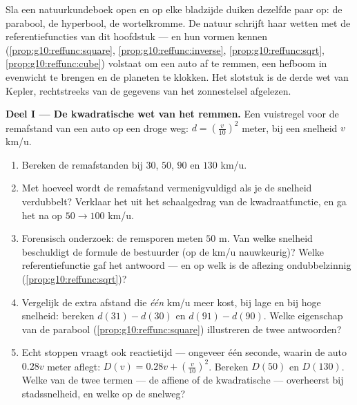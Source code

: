 \begin{problem}
\label{pb:g10:reffunc:1}
Sla een natuurkundeboek open en op elke bladzijde duiken dezelfde paar
 op: de parabool, de hyperbool, de wortelkromme. De natuur schrijft
haar wetten met de referentiefuncties van dit hoofdstuk --- en hun vormen
kennen (\cref{prop:g10:reffunc:square}, \cref{prop:g10:reffunc:inverse},
\cref{prop:g10:reffunc:sqrt}, \cref{prop:g10:reffunc:cube}) volstaat om een
auto af te remmen, een hefboom in evenwicht te brengen en de planeten te
klokken. Het slotstuk is de derde wet van Kepler, rechtstreeks van de
gegevens van het zonnestelsel afgelezen.

\medskip
\noindent\textbf{Deel I --- De kwadratische wet van het remmen.}
Een vuistregel voor de remafstand van een auto op een droge weg:
$d = \left(\frac{v}{10}\right)^{2}$ meter, bij een snelheid $v$ km/u.
\begin{enumerate}
  \item Bereken de remafstanden bij $30$, $50$, $90$ en $130$ km/u.
  \item Met hoeveel wordt de remafstand vermenigvuldigd als je de snelheid
        verdubbelt? Verklaar het uit het schaalgedrag van de
        kwadraatfunctie, en ga het na op $50 \to 100$ km/u.
  \item Forensisch onderzoek: de remsporen meten $50$ m. Van welke snelheid
        beschuldigt de formule de bestuurder (op de km/u nauwkeurig)? Welke
        referentiefunctie gaf het antwoord --- en op welk  is de
        aflezing ondubbelzinnig (\cref{prop:g10:reffunc:sqrt})?
  \item Vergelijk de extra afstand die \emph{één} km/u meer kost, bij lage en
        bij hoge snelheid: bereken $d(31) - d(30)$ en $d(91) - d(90)$. Welke
        eigenschap van de parabool (\cref{prop:g10:reffunc:square})
        illustreren de twee antwoorden?
  \item Echt stoppen vraagt ook reactietijd --- ongeveer één seconde, waarin
        de auto $0.28v$ meter aflegt:
        $D(v) = 0.28v + \left(\frac{v}{10}\right)^2$. Bereken $D(50)$ en
        $D(130)$. Welke van de twee termen --- de affiene of de kwadratische
        --- overheerst bij stadssnelheid, en welke op de snelweg?
\end{enumerate}


\end{problem}
